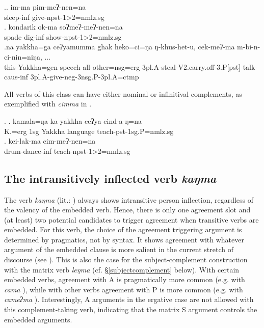 \ex.\ag. im-ma pim-meʔ-nen=na\\
	sleep-{\sc inf} give-{\sc npst-1>2=nmlz.sg}\\
	\bg. kondarik ok-ma soʔmeʔ-meʔ-nen=na\\
	spade dig{\sc -inf} show{\sc -npst-1>2=nmlz.sg}		\\
	\bg.na   yakkha=ga ceʔyamumma ghak     heko=ci=ŋa      ŋ-khus-het-u, cek-meʔ-ma m-bi-n-ci-nin=niŋa,  ...  \\
this Yakkha{\sc =gen}  speech all other{\sc =nsg=erg} {\sc 3pl.A-}steal{\sc -V2.carry.off-3.P[pst]} talk{\sc -caus-inf} {\sc 3pl.A-}give{\sc -neg-3nsg.P-3pl.A=ctmp} \\
 
	
	
All verbs of this class can have either nominal or infinitival complements, as exemplified with \emph{cimma}  in \Next.

\ex. \ag. kamala=ŋa ka yakkha ceʔya cind-a-ŋ=na\\
		K.{\sc =erg} {\sc 1sg} Yakkha language teach{\sc [3sg.A]-pst-1sg.P=nmlz.sg}	\\
 	\bg. kei-lak-ma cim-meʔ-nen=na\\
	drum-dance-{\sc inf} teach{\sc -npst-1>2=nmlz.sg}\\

	
\subsection{The intransitively inflected verb  \emph{kaŋma} }

The verb \emph{kaŋma}   (lit.: ) always shows intransitive person inflection, regardless of the valency of the embedded verb. Hence, there is only one agreement slot and (at least) two potential candidates to trigger  agreement when transitive verbs are embedded. For this  verb, the choice of the agreement triggering argument is determined by pragmatics, not by syntax. It shows agreement with whatever argument of the embedded clause is more salient in the current stretch of discourse (see \Next). This is also the case for the subject-complement construction with the matrix verb \emph{leŋma}  (cf. §\ref{subjectcomplement} below). With certain embedded verbs, agreement with A is pragmatically more common (e.g. with \emph{cama} ), while with other  verbs agreement with P is more common (e.g. with \emph{cameʔma} ). Interestingly, A arguments in the ergative case are not allowed with this complement-taking verb, indicating that the matrix S argument controls the embedded arguments.

